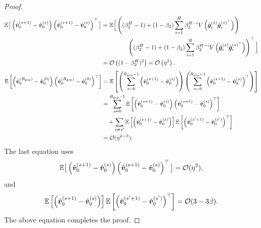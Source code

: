 \begin{proof}
    \begin{align*}
        \mathbb{E}\big[\left(\hat{{\bm{v}}}_0^{(s+1)} - \hat{{\bm{v}}}_0^{(s)}\right)\left(\hat{{\bm{v}}}_0^{(s+1)} - \hat{{\bm{v}}}_0^{(s)}\right)^{\top}\big] &= \mathbb{E}\Big[\left((\beta_2^H-1) + (1-\beta_2)\sum_{i=1}^H\beta_2^{H-i}V\left(\hat{{\bm{g}}}_i^{(s)} {\hat{{\bm{g}}}_i^{(s)^\top}}\right)\right)\\
        &~~~~~~~~~~~~~\left((\beta_2^H-1) + (1-\beta_2)\sum_{i=1}^H\beta_2^{H-i}V\left(\hat{{\bm{g}}}_i^{(s)} {\hat{{\bm{g}}}_i^{(s)^\top}}\right)\right)^{\top}\Big]\\
        &= \mathcal{O}\left((1-\beta_2^H)^{2}\right)=\mathcal{O}\left(\eta^2\right).
    \end{align*}
    \begin{align*}
         \mathbb{E}\left[\left(\hat{{\bm{v}}}_0^{(R_{\mathrm{grp}})} - \hat{{\bm{v}}}_0^{(0)}\right)\left(\hat{{\bm{v}}}_0^{(R_{\mathrm{grp}})} - \hat{{\bm{v}}}_0^{(0)}\right)^{\top}\right] &=  \mathbb{E}\left[\left(\sum_{s=0}^{R_{\mathrm{grp}}-1}\left(\hat{{\bm{v}}}_0^{(s+1)} - \hat{{\bm{v}}}_0^{(s)}\right)\right)\left(\sum_{s=0}^{R_{\mathrm{grp}}-1}\left(\hat{{\bm{v}}}_0^{(s+1)} - \hat{{\bm{v}}}_0^{(s)}\right)^{\top}\right)\right]\\
         &=\sum_{s=0}^{R_{\mathrm{grp}}-1} \mathbb{E}\left[\left(\hat{{\bm{v}}}_0^{(s+1)} - \hat{{\bm{v}}}_0^{(s)}\right)\left(\hat{{\bm{v}}}_0^{(s+1)} - \hat{{\bm{v}}}_0^{(s)}\right)^{\top}\right] \\
         &~~~+ \sum_{s\neq s'}\mathbb{E}\left[\left(\hat{{\bm{v}}}_0^{(s+1)} - \hat{{\bm{v}}}_0^{(s)}\right)\right]\mathbb{E}\left[\left(\hat{{\bm{v}}}_0^{(s'+1)} - \hat{{\bm{v}}}_0^{(s')}\right)^{\top}\right]\\
         &=\mathcal{O}(\eta^{2-\beta}).
    \end{align*}
    The last equation uses 
    $$\mathbb{E}\big[\left(\hat{{\bm{v}}}_0^{(s+1)} - \hat{{\bm{v}}}_0^{(s)}\right)\left(\hat{{\bm{v}}}_0^{(s+1)} - \hat{{\bm{v}}}_0^{(s)}\right)^{\top}\big] = \mathcal{O}(\eta^2),$$
    and 
    $$\mathbb{E}\left[\left(\hat{{\bm{v}}}_0^{(s+1)} - \hat{{\bm{v}}}_0^{(s)}\right)\right]\mathbb{E}\left[\left(\hat{{\bm{v}}}_0^{(s'+1)} - \hat{{\bm{v}}}_0^{(s')}\right)^{\top}\right] = \mathcal{O}(3 - 3\beta).$$
    The above equation completes the proof.
\end{proof}
